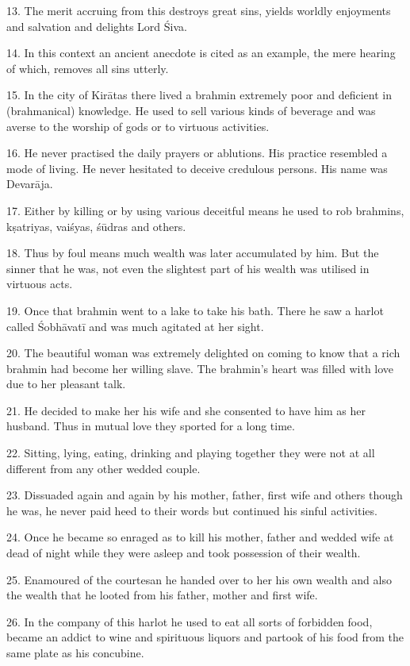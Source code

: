 13. The merit accruing from this  destroys great sins, yields worldly
enjoyments and salvation and delights Lord Śiva.

14. In this context an ancient anecdote is cited as an example, the mere hearing
of which, removes all sins utterly.

15. In the city of Kirātas there lived a brahmin extremely poor and deficient in
(brahmanical) knowledge. He used to sell various kinds of beverage and was
averse to the worship of gods or to virtuous activities.

16. He never practised the daily  prayers or ablutions. His practice
resembled a  mode of living. He never hesitated to deceive
credulous persons. His name was Devarāja.

17. Either by killing or by using various deceitful means he used to rob
brahmins, kṣatriyas, vaiśyas, śūdras and others.

18. Thus by foul means much wealth was later accumulated by him. But the sinner
that he was, not even the slightest part of his wealth was utilised in virtuous
acts.

19. Once that brahmin went to a lake to take his bath. There he saw a harlot
called Śobhāvatī and was much agitated at her sight.

20. The beautiful woman was extremely delighted on coming to know that a rich
brahmin had become her willing slave. The brahmin’s heart was filled with love
due to her pleasant talk.

21. He decided to make her his wife and she consented to have him as her
husband. Thus in mutual love they sported for a long time.

22. Sitting, lying, eating, drinking and playing together they were not at all
different from any other wedded couple.

23. Dissuaded again and again by his mother, father, first wife and others
though he was, he never paid heed to their words but continued his sinful
activities.

24. Once he became so enraged as to kill his mother, father and wedded wife at
dead of night while they were asleep and took possession of their wealth.

25. Enamoured of the courtesan he handed over to her his own wealth and also
the wealth that he looted from his father, mother and first wife.

26. In the company of this harlot he used to eat all sorts of forbidden food,
became an addict to wine and spirituous liquors and partook of his food from
the same plate as his concubine.

